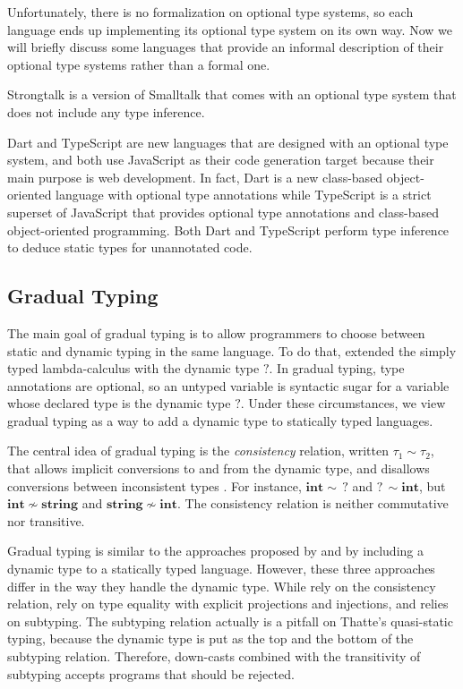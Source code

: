 \documentclass[preprint]{sig-alternate}
\begin{document}
Unfortunately, there is no formalization on optional type systems,
so each language ends up implementing its optional type system on
its own way.
Now we will briefly discuss some languages that provide an informal
description of their optional type systems rather than a formal one.

Strongtalk \cite{bracha1993strongtalk,bracha1996strongtalk} is
a version of Smalltalk that comes with an optional type system that
does not include any type inference.

Dart \cite{dart} and TypeScript \cite{typescript} are new
languages that are designed with an optional type system, and both
use JavaScript as their code generation target because their main
purpose is web development.
In fact, Dart is a new class-based object-oriented language with
optional type annotations while TypeScript is a strict superset of
JavaScript that provides optional type annotations and class-based
object-oriented programming.
Both Dart and TypeScript perform type inference to deduce static
types for unannotated code.

\subsection{Gradual Typing}

The main goal of gradual typing \cite{siek2006gradual} is to allow
programmers to choose between static and dynamic typing in the same
language.
To do that, \cite{siek2006gradual} extended the simply typed
lambda-calculus with the dynamic type $?$.
In gradual typing, type annotations are optional, so an untyped
variable is syntactic sugar for a variable whose declared type is
the dynamic type $?$.
Under these circumstances, we view gradual typing as a way to add
a dynamic type to statically typed languages.

The central idea of gradual typing is the \textit{consistency}
relation, written $\tau_{1} \sim \tau_{2}$, that allows implicit
conversions to and from the dynamic type, and disallows conversions
between inconsistent types \cite{siek2006gradual}.
For instance, $\mathbf{int} \sim \,?$ and $?\, \sim \mathbf{int}$,
but $\mathbf{int} \not\sim \mathbf{string}$ and
$\mathbf{string} \not\sim \mathbf{int}$. 
The consistency relation is neither commutative nor transitive.

Gradual typing is similar to the approaches proposed by
\cite{abadi1989dts} and \cite{thatte1990qst} by including a
dynamic type to a statically typed language.
However, these three approaches differ in the way they handle the
dynamic type.
While \cite{siek2006gradual} rely on the consistency relation,
\cite{abadi1989dts} rely on type equality with explicit projections
and injections, and \cite{thatte1990qst} relies on subtyping.
The subtyping relation actually is a pitfall on Thatte's quasi-static
typing, because the dynamic type is put as the top and the bottom of
the subtyping relation.
Therefore, down-casts combined with the transitivity of subtyping
accepts programs that should be rejected.
\end{document}

